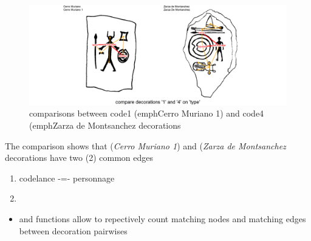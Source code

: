 \documentclass[article]{jss}\usepackage{knitr}
\begin{document}
\begin{knitrout}
\color{fgcolor}\begin{kframe}
\begin{alltt}
\hlstd{(}\hlstd{=}\hlstd{(}\hlstd{,}\hlstd{,}\hlstd{,}\hlstd{))}
 \hlkwb{<-}  \hlstd{(}\hlstd{,}\hlstd{),}
\hlstd{+ }                               \hlstd{=} \hlstd{(}\hlstd{,}  \hlstd{=} \hlstd{))}
\hlstd{(}
\end{alltt}
\end{kframe}\begin{figure}[H]

{\centering \includegraphics[width=\maxwidth]{figure/unnamed-chunk-13-1} 

}

\caption{\label{fig:figs}comparisons between code{1} (emph{Cerro Muriano 1}) and code{4} (emph{Zarza de Montsanchez} decorations}\label{fig:unnamed-chunk-13}
\end{figure}


\end{knitrout}

The comparison shows that  (\emph{Cerro Muriano 1}) and  (\emph{Zarza de Montsanchez} decorations have two (2) common edges
\begin{enumerate}
\item code{lance -=- personnage}
\item {}
\end{enumerate}

\begin{itemize}
\setlength\itemsep{.1em}
  \item {} and  functions allow to repectively count matching nodes and matching edges between decoration pairwises
\end{itemize}
\end{document}
